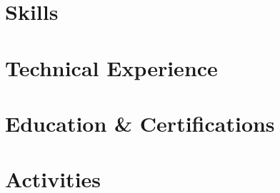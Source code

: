 \documentclass[10pt]{article}
\begin{document}
\pagestyle{others}\thispagestyle{first_page}



\section{Skills}
\vspace{.3em}


\section{Technical Experience}



\section{Education \& Certifications}


\section{Activities}

\end{document}

